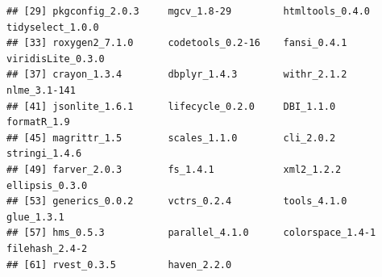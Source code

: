 \documentclass{article}\usepackage[]{graphicx}\usepackage[]{color}
\makeatletter
\newenvironment{kframe}{%
 \def\at@end@of@kframe{}%
 \ifinner\ifhmode%
  \def\at@end@of@kframe{\end{minipage}}%
  \begin{minipage}{\columnwidth}%
 \fi\fi%
 \def\FrameCommand##1{\hskip\@totalleftmargin \hskip-\fboxsep
 \colorbox{shadecolor}{##1}\hskip-\fboxsep
     \hskip-\linewidth \hskip-\@totalleftmargin \hskip\columnwidth}%
 \MakeFramed {\advance\hsize-\width
   \@totalleftmargin\z@ \linewidth\hsize
   \@setminipage}}%
 {\par\unskip\endMakeFramed%
 \at@end@of@kframe}
\newenvironment{knitrout}{}{} %
\makeatother
\begin{document}
\begin{knitrout}
\begin{kframe}
\begin{verbatim}
## [29] pkgconfig_2.0.3     mgcv_1.8-29         htmltools_0.4.0     tidyselect_1.0.0   
## [33] roxygen2_7.1.0      codetools_0.2-16    fansi_0.4.1         viridisLite_0.3.0  
## [37] crayon_1.3.4        dbplyr_1.4.3        withr_2.1.2         nlme_3.1-141       
## [41] jsonlite_1.6.1      lifecycle_0.2.0     DBI_1.1.0           formatR_1.9        
## [45] magrittr_1.5        scales_1.1.0        cli_2.0.2           stringi_1.4.6      
## [49] farver_2.0.3        fs_1.4.1            xml2_1.2.2          ellipsis_0.3.0     
## [53] generics_0.0.2      vctrs_0.2.4         tools_4.1.0         glue_1.3.1         
## [57] hms_0.5.3           parallel_4.1.0      colorspace_1.4-1    filehash_2.4-2     
## [61] rvest_0.3.5         haven_2.2.0
\end{verbatim}
\end{kframe}
\end{knitrout}
\end{document}

